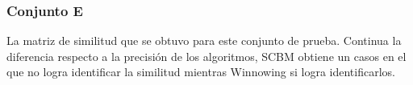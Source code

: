 \subsubsection{Conjunto E}
La matriz de similitud que se obtuvo para este conjunto de prueba. Continua la diferencia respecto a la precisión de los algoritmos, SCBM obtiene un casos en el que no logra identificar la similitud mientras Winnowing si logra identificarlos.
\begin{figure}[!h]
\centering
{}
\hspace{-1.5cm}
\hspace{-1.5cm}
\end{figure}
